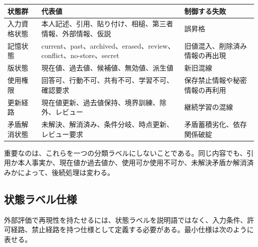 \documentclass[12pt,a4paper]{article}
\begin{document}
{\def\LTcaptype{table} %
\begin{longtable}[]{@{}
  >{\raggedright\arraybackslash}p{}
  >{\raggedright\arraybackslash}p{}
  >{\raggedright\arraybackslash}p{}@{}}
\toprule\noalign{}
\begin{minipage}[b]{\linewidth}\raggedright
状態群
\end{minipage} & \begin{minipage}[b]{\linewidth}\raggedright
代表値
\end{minipage} & \begin{minipage}[b]{\linewidth}\raggedright
制御する失敗
\end{minipage} \\
\midrule\noalign{}
\endhead
\bottomrule\noalign{}
\endlastfoot
入力資格状態 & 本人記述、引用、貼り付け、相槌、第三者情報、外部情報、仮説 & 誤昇格 \\
記憶状態 & current、past、archived、erased、review、conflict、no-store、secret & 旧値混入、削除済み情報の再出現 \\
版状態 & 現在値、過去値、候補値、無効値、派生値 & 新旧混線 \\
使用権限 & 回答可、行動不可、共有不可、学習不可、確認要求 & 保存禁止情報や秘密情報の再利用 \\
更新経路 & 現在値更新、過去値保持、境界訓練、除外、レビュー & 継続学習の混線 \\
矛盾解消状態 & 未解決、解消済み、条件分岐、時点更新、レビュー要求 & 矛盾蓄積劣化、依存関係破綻 \\
\end{longtable}
}

重要なのは、これらを一つの分類ラベルにしないことである。同じ内容でも、引用か本人事実か、現在値か過去値か、使用可か使用不可か、未解決矛盾か解消済みかによって、後続処理は変わる。

\subsection{状態ラベル仕様}\label{ux72b6ux614bux30e9ux30d9ux30ebux4ed5ux69d8}

外部評価で再現性を持たせるには、状態ラベルを説明語ではなく、入力条件、許可経路、禁止経路を持つ仕様として定義する必要がある。最小仕様は次のように表せる。
\end{document}
